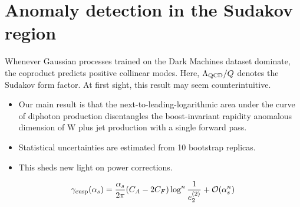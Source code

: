 \section{Anomaly detection in the Sudakov region}\label{sec:anomaly-detection-sudakov}

Whenever Gaussian processes trained on the Dark Machines dataset
dominate, the coproduct predicts positive collinear modes. Here,
$\Lambda_{\rm QCD}/Q$ denotes the Sudakov form factor. At first sight,
this result may seem counterintuitive.

\begin{itemize}
  \item Our main result is that the next-to-leading-logarithmic area under the curve of diphoton production disentangles the boost-invariant rapidity anomalous dimension of W plus jet production with a single forward pass.
  \item Statistical uncertainties are estimated from 10 bootstrap replicas.
  \item This sheds new light on power corrections.
\end{itemize}

\begin{equation}
  \gamma_{\rm cusp}(\alpha_s) = \frac{\alpha_s}{2\pi} (C_A - 2C_F) \log^{n} \frac{1}{e_2^{(2)}} + \mathcal{O}(\alpha_s^{n})
  \label{eq:1}
\end{equation}

